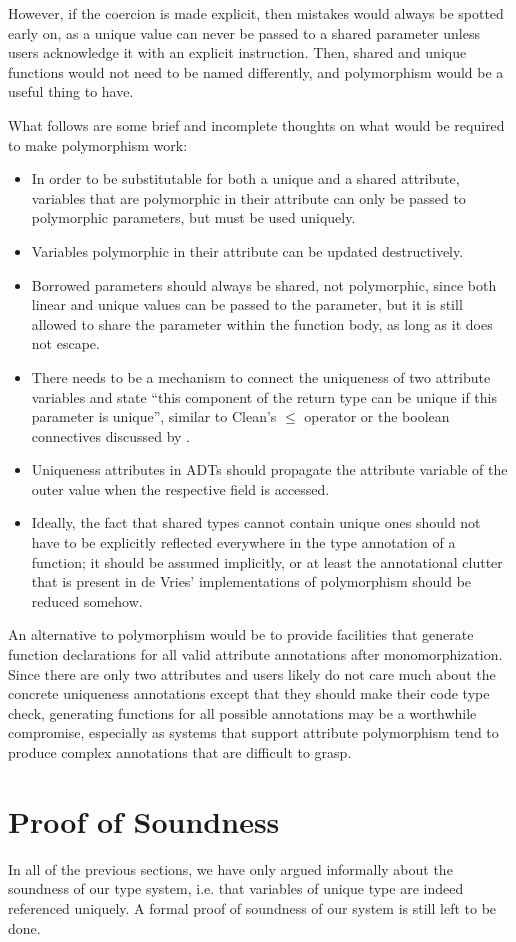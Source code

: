 However, if the coercion is made explicit, then mistakes would always be spotted early on, as a unique value can never be passed to a shared parameter unless users acknowledge it with an explicit instruction. Then, shared and unique functions would not need to be named differently, and polymorphism would be a useful thing to have.

What follows are some brief and incomplete thoughts on what would be required to make polymorphism work:
\begin{itemize}
	\item In order to be substitutable for both a unique and a shared attribute, variables that are polymorphic in their attribute can only be passed to polymorphic parameters, but must be used uniquely.
	\item Variables polymorphic in their attribute can be updated destructively.
	\item Borrowed parameters should always be shared, not polymorphic, since both linear and unique values can be passed to the parameter, but it is still allowed to share the parameter within the function body, as long as it does not escape.
	\item There needs to be a mechanism to connect the uniqueness of two attribute variables and state ``this component of the return type can be unique if this parameter is unique'', similar to Clean's $\leq$ operator or the boolean connectives discussed by \cite{vries_making_2009}.
	\item Uniqueness attributes in ADTs should propagate the attribute variable of the outer value when the respective field is accessed.
	\item Ideally, the fact that shared types cannot contain unique ones should not have to be explicitly reflected everywhere in the type annotation of a function; it should be assumed implicitly, or at least the annotational clutter that is present in de Vries' implementations of polymorphism should be reduced somehow.
\end{itemize}

An alternative to polymorphism would be to provide facilities that generate function declarations for all valid attribute annotations after monomorphization. Since there are only two attributes and users likely do not care much about the concrete uniqueness annotations except that they should make their code type check, generating functions for all possible annotations may be a worthwhile compromise, especially as systems that support attribute polymorphism tend to produce complex annotations that are difficult to grasp.

\section{Proof of Soundness}
In all of the previous sections, we have only argued informally about the soundness of our type system, i.e. that variables of unique type are indeed referenced uniquely. A formal proof of soundness of our system is still left to be done.